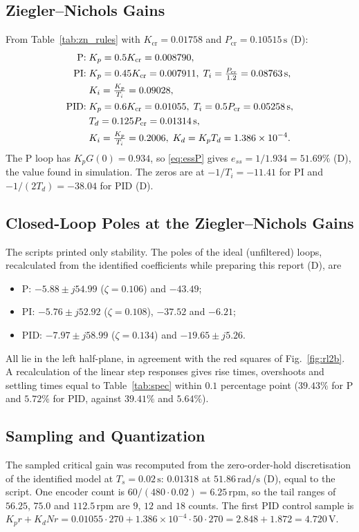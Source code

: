 \documentclass[lettersize,journal]{IEEEtran}
\newcommand{\Ts}{T_{\!s}}
\newcommand{\Kcr}{K_{\mathrm{cr}}}
\newcommand{\Pcr}{P_{\mathrm{cr}}}
\newcommand{\rpm}{\,\text{rpm}}
\begin{document}
\subsection{Ziegler--Nichols Gains}
From Table~\ref{tab:zn_rules} with $\Kcr=0.01758$ and $\Pcr=0.10515\,\text{s}$ (D):
\begin{align}
\text{P:}\;& K_p=0.5\Kcr=0.008790,\notag\\
\text{PI:}\;& K_p=0.45\Kcr=0.007911,\; T_i=\tfrac{\Pcr}{1.2}=0.08763\,\text{s},\notag\\
& K_i=\tfrac{K_p}{T_i}=0.09028,\notag\\
\text{PID:}\;& K_p=0.6\Kcr=0.01055,\; T_i=0.5\Pcr=0.05258\,\text{s},\notag\\
& T_d=0.125\Pcr=0.01314\,\text{s},\notag\\
& K_i=\tfrac{K_p}{T_i}=0.2006,\; K_d=K_pT_d=1.386\times10^{-4}.
\end{align}
The P loop has $K_pG(0)=0.934$, so \eqref{eq:essP} gives $e_{ss}=1/1.934=51.69\%$ (D), the value found in simulation. The zeros are at $-1/T_i=-11.41$ for PI and $-1/(2T_d)=-38.04$ for PID (D).

\subsection{Closed-Loop Poles at the Ziegler--Nichols Gains}
The scripts printed only stability. The poles of the ideal (unfiltered) loops, recalculated from the identified coefficients while preparing this report (D), are
\begin{itemize}
\item P: $-5.88\pm j54.99$ ($\zeta=0.106$) and $-43.49$;
\item PI: $-5.76\pm j52.92$ ($\zeta=0.108$), $-37.52$ and $-6.21$;
\item PID: $-7.97\pm j58.99$ ($\zeta=0.134$) and $-19.65\pm j5.26$.
\end{itemize}
All lie in the left half-plane, in agreement with the red squares of Fig.~\ref{fig:rl2b}. A recalculation of the linear step responses gives rise times, overshoots and settling times equal to Table~\ref{tab:spec} within $0.1$ percentage point ($39.43\%$ for P and $5.72\%$ for PID, against $39.41\%$ and $5.64\%$).

\subsection{Sampling and Quantization}
The sampled critical gain was recomputed from the zero-order-hold discretisation of the identified model at $\Ts=0.02\,\text{s}$: $0.01318$ at $51.86\,\text{rad/s}$ (D), equal to the script. One encoder count is $60/(480\cdot0.02)=6.25\rpm$, so the tail ranges of $56.25$, $75.0$ and $112.5\rpm$ are $9$, $12$ and $18$ counts. The first PID control sample is $K_pr+K_dNr=0.01055\cdot270+1.386\times10^{-4}\cdot50\cdot270=2.848+1.872=4.720\,\text{V}$.
\end{document}
